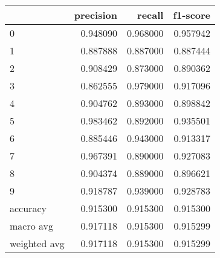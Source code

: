 \begin{tabular}{lrrr}
\toprule
 & precision & recall & f1-score \\
\midrule
0 & 0.948090 & 0.968000 & 0.957942 \\
1 & 0.887888 & 0.887000 & 0.887444 \\
2 & 0.908429 & 0.873000 & 0.890362 \\
3 & 0.862555 & 0.979000 & 0.917096 \\
4 & 0.904762 & 0.893000 & 0.898842 \\
5 & 0.983462 & 0.892000 & 0.935501 \\
6 & 0.885446 & 0.943000 & 0.913317 \\
7 & 0.967391 & 0.890000 & 0.927083 \\
8 & 0.904374 & 0.889000 & 0.896621 \\
9 & 0.918787 & 0.939000 & 0.928783 \\
accuracy & 0.915300 & 0.915300 & 0.915300 \\
macro avg & 0.917118 & 0.915300 & 0.915299 \\
weighted avg & 0.917118 & 0.915300 & 0.915299 \\
\bottomrule
\end{tabular}
